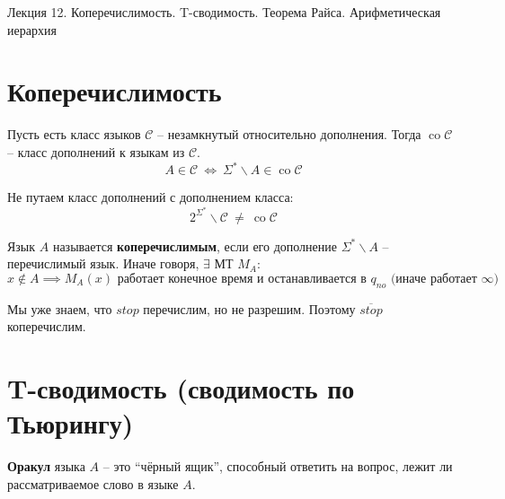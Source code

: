 \documentclass[11pt]{article}
\DeclareMathOperator{\co}{co}
\begin{document}
\begin{titlepage}
    \centering
    \vspace*{\fill}  %

    {\Huge Лекция 12. Коперечислимость. T-сводимость. 
    Теорема Райса. Арифметическая иерархия
    \par}

    \vspace*{\fill}  %
\end{titlepage}

\setcounter{page}{1}

\section{Коперечислимость}

\begin{definition}
  Пусть есть класс языков $\mathcal{C}$ -- незамкнутый относительно 
  дополнения. Тогда $\co \mathcal{C}$ -- класс дополнений к языкам из 
  $\mathcal{C}$.
  \[A \in \mathcal{C} \ \Longleftrightarrow \ \Sigma^{\ast} \backslash A 
  \in \co \mathcal{C}\]
\end{definition}

\begin{remark}
  Не путаем класс дополнений с дополнением класса:
  \[2^{\Sigma^{\ast}} \backslash \mathcal{C} \ \neq \ \co \mathcal{C}\]
\end{remark}

\begin{definition}
  Язык $A$ называется \textbf{коперечислимым}, если его дополнение 
  $\Sigma^{\ast} \backslash A$ -- перечислимый язык. Иначе говоря, 
  $\exists \text{ МТ } M_A$: 
  \[x \notin A \implies M_A(x) \text{ работает конечное время и останавливается 
  в } q_{no} \text{ (иначе работает } \infty)\]
\end{definition}

\begin{example}
  Мы уже знаем, что $stop$ перечислим, но не разрешим. Поэтому 
  $\overline{stop}$ коперечислим.
\end{example}

\section{T-сводимость (сводимость по Тьюрингу)}

\begin{definition}
  \textbf{Оракул} языка $A$ -- это ``чёрный ящик'', способный ответить 
  на вопрос, лежит ли рассматриваемое слово в языке $A$.
\end{definition}
\end{document}
